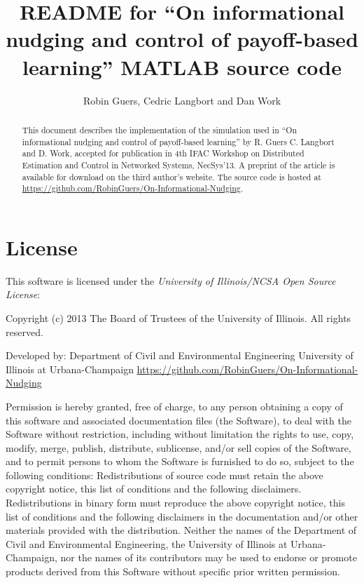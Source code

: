 \documentclass[english]{article}
\begin{document}
\title{README for ``On informational nudging and control of payoff-based learning'' MATLAB source code}


\author{Robin Guers, Cedric Langbort and Dan Work}
\maketitle
\begin{abstract}
This document describes the implementation of the simulation used in ``On informational nudging and control of payoff-based learning'' by R. Guers C. Langbort and D. Work, accepted for publication in 4th IFAC Workshop on Distributed Estimation and Control in Networked Systems, NecSys'13.
A preprint of the article is available for download on the third
author's website. The source code is hosted at \url{https://github.com/RobinGuers/On-Informational-Nudging}.
\end{abstract}

\section{License}

This software is licensed under the \emph{University of Illinois/NCSA
Open Source License}:

\begin{center}
Copyright (c) 2013 The Board of Trustees of the University of Illinois.
All rights reserved.
\par\end{center}

\begin{center}
Developed by: Department of Civil and Environmental Engineering University
of Illinois at Urbana-Champaign \url{https://github.com/RobinGuers/On-Informational-Nudging}
\par\end{center}

Permission is hereby granted, free of charge, to any person obtaining
a copy of this software and associated documentation files (the \textquotedbl{}Software\textquotedbl{}),
to deal with the Software without restriction, including without limitation
the rights to use, copy, modify, merge, publish, distribute, sublicense,
and/or sell copies of the Software, and to permit persons to whom
the Software is furnished to do so, subject to the following conditions:
Redistributions of source code must retain the above copyright notice,
this list of conditions and the following disclaimers. Redistributions
in binary form must reproduce the above copyright notice, this list
of conditions and the following disclaimers in the documentation and/or
other materials provided with the distribution. Neither the names
of the Department of Civil and Environmental Engineering, the University
of Illinois at Urbana-Champaign, nor the names of its contributors
may be used to endorse or promote products derived from this Software
without specific prior written permission.
\end{document}
